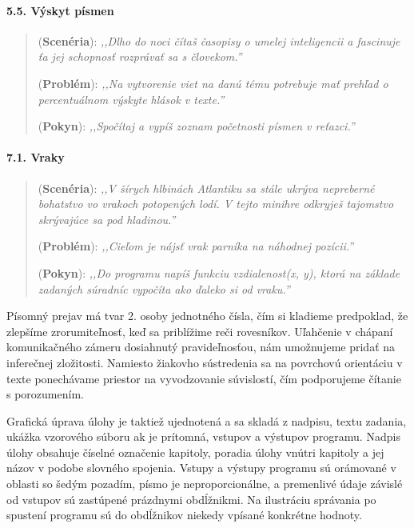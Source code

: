 \paragraph{5.5. Výskyt písmen}
\begin{quote}
(\textbf{Scenéria}): \textit{\small ,,Dlho do noci čítaš časopisy o umelej inteligencii a fascinuje ťa jej schopnosť rozprávať sa s človekom.''}

(\textbf{Problém}): \textit{\small ,,Na vytvorenie viet na danú tému potrebuje mať prehľad o percentuálnom výskyte hlások v texte.''}

(\textbf{Pokyn}): \textit{\small ,,Spočítaj a vypíš zoznam početnosti písmen v reťazci.''}
\end{quote}

\paragraph{7.1. Vraky}
\begin{quote}
(\textbf{Scenéria}): \textit{\small ,,V šírych hlbinách Atlantiku sa stále ukrýva nepreberné bohatstvo vo vrakoch potopených lodí. V tejto minihre odkryješ tajomstvo skrývajúce sa pod hladinou.''}

(\textbf{Problém}): \textit{\small ,,Cieľom je nájsť vrak parníka na náhodnej pozícii.''}

(\textbf{Pokyn}): \textit{\small ,,Do programu napíš funkciu vzdialenost(x, y), ktorá na základe zadaných súradníc vypočíta ako ďaleko si od vraku.''}
\end{quote}

Písomný prejav má tvar 2. osoby jednotného čísla, čím si kladieme predpoklad, že zlepšíme zrorumiteľnosť, keď sa priblížime reči rovesníkov. Uľahčenie v chápaní komunikačného zámeru dosiahnutý pravideľnosťou, nám umožnujeme pridať na inferečnej zložitosti. Namiesto žiakovho sústredenia sa na povrchovú orientáciu v texte ponechávame priestor na vyvodzovanie súvislostí, čím podporujeme čítanie s porozumením.

Grafická úprava úlohy je taktiež ujednotená a sa skladá z nadpisu, textu zadania, ukážka vzorového súboru ak je prítomná, vstupov a výstupov programu. Nadpis úlohy obsahuje číselné označenie kapitoly, poradia úlohy vnútri kapitoly a jej názov v podobe slovného spojenia.
Vstupy a výstupy programu sú orámované v oblasti so šedým pozadím, písmo je neproporcionálne, a premenlivé údaje závislé od vstupov sú zastúpené prázdnymi obdĺžnikmi. Na ilustráciu správania po spustení programu sú do obdĺžnikov niekedy vpísané konkrétne hodnoty.

